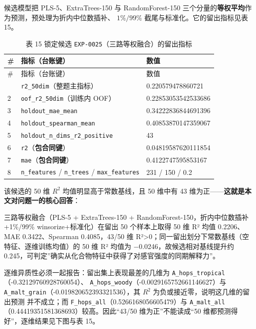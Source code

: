 \documentclass[
  a4paper,12pt]{article}
\begin{document}
候选模型把 PLS-5、ExtraTrees-150 与 RandomForest-150
三个分量的\textbf{等权平均}作为预测，预处理为折内中位数插补、
\(1\%/99\%\) 截尾与标准化。它的留出指标见表 15。

\begin{longtable}[]{@{}lll@{}}
\caption{表 15 锁定候选
\protect\texttt{EXP-0025}（三路等权融合）的留出指标}\tabularnewline
\toprule\noalign{}
\# & 指标（台账键） & 数值 \\
\midrule\noalign{}
\endfirsthead
\toprule\noalign{}
\# & 指标（台账键） & 数值 \\
\midrule\noalign{}
\endhead
\bottomrule\noalign{}
\endlastfoot
1 & \texttt{r2\_50dim}（整题主指标） & 0.220579478860721 \\
2 & \texttt{oof\_r2\_50dim}（训练内 OOF） & 0.22853053542533686 \\
3 & \texttt{holdout\_mae\_mean} & 0.34222836844691396 \\
4 & \texttt{holdout\_spearman\_mean} & 0.40853870147359067 \\
5 & \texttt{holdout\_n\_dims\_r2\_positive} & 43 \\
6 & \texttt{r2}（\textbf{包合同键}） & 0.04819587620111854 \\
7 & \texttt{mae}（\textbf{包合同键}） & 0.4122747595853167 \\
8 & \texttt{n\_features} / \texttt{n\_trees} / \texttt{max\_features} &
231 / 150 / 0.2 \\
\end{longtable}

该候选的 50 维 \(R^2\) 均值明显高于常数基线，且 50 维中有 43
维为正------\textbf{这就是本文对问题一的核心回答}：

三路等权融合（PLS-5 + ExtraTrees-150 +
RandomForest-150，折内中位数插补+1\%/99\% winsorize+标准化）在留出 50
个样本上取得 50 维 R² 均值 0.2206、MAE 0.3422、Spearman 0.4085，43/50 维
R²\textgreater0；同一留出划分下常数基线（空特征、逐维训练均值）的 50 维
R² 均值为 −0.0246，故候选相对基线提升约
0.245，可判定''确实从化合物特征中获得了对感官强度的同期解释力''。

逐维异质性必须一起报告：留出集上表现最差的几维为
\texttt{A\_hops\_tropical}（-0.32129760928760054）、
\texttt{A\_hops\_woody}（-0.0029165752661146627）与
\texttt{A\_malt\_grain}（-0.019820652393321536），其 \(R^2\)
为负或接近零，说明这几维的留出预测 并不成立；而
\texttt{F\_hops\_all}（0.5266168056605479）与
\texttt{A\_malt\_all}（0.44419351581368693）较高。因此``43/50
维为正''不能读成``50 维都预测得 好''，逐维结果见下图与表 15。
\end{document}
